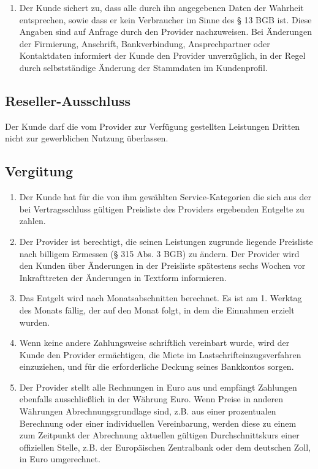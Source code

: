\documentclass{terms}
\begin{document}
\begin{enumerate}
\item Der Kunde sichert zu, dass alle durch ihn angegebenen Daten der Wahrheit entsprechen, sowie dass er kein Verbraucher im Sinne des § 13 BGB ist. Diese Angaben sind auf Anfrage durch den Provider nachzuweisen. Bei Änderungen der Firmierung, Anschrift, Bankverbindung, Ansprechpartner oder Kontaktdaten informiert der Kunde den Provider unverzüglich, in der Regel durch selbstständige Änderung der Stammdaten im Kundenprofil.
\end{enumerate}


\subsection{Reseller-Ausschluss}

Der Kunde darf die vom Provider zur Verfügung gestellten Leistungen Dritten nicht zur gewerblichen Nutzung überlassen.

\subsection{Vergütung}
\begin{enumerate}
\item Der Kunde hat für die von ihm gewählten Service-Kategorien die sich aus der bei Vertragsschluss gültigen Preisliste des Providers ergebenden Entgelte zu zahlen.
\item Der Provider ist berechtigt, die seinen Leistungen zugrunde liegende Preisliste nach billigem Ermessen (§ 315 Abs. 3 BGB) zu ändern. Der Provider wird den Kunden über Änderungen in der Preisliste spätestens sechs Wochen vor Inkrafttreten der Änderungen in Textform informieren.
\item Das Entgelt wird nach Monatsabschnitten berechnet. Es ist am 1. Werktag des Monats fällig, der auf den Monat folgt, in dem die Einnahmen erzielt wurden.
\item Wenn keine andere Zahlungsweise schriftlich vereinbart wurde, wird der Kunde den Provider ermächtigen, die Miete im Lastschrifteinzugsverfahren einzuziehen, und für die erforderliche Deckung seines Bankkontos sorgen.
\item Der Provider stellt alle Rechnungen in Euro aus und empfängt Zahlungen ebenfalls ausschließlich in der Währung Euro. Wenn Preise in anderen Währungen Abrechnungsgrundlage sind, z.B. aus einer prozentualen Berechnung oder einer individuellen Vereinbarung, werden diese zu einem zum Zeitpunkt der Abrechnung aktuellen gültigen Durchschnittskurs einer offiziellen Stelle, z.B. der Europäischen Zentralbank oder dem deutschen Zoll, in Euro umgerechnet.
\end{enumerate}
\end{document}
